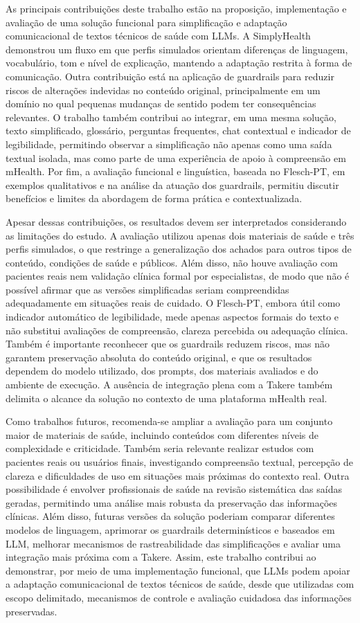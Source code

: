 As principais contribuições deste trabalho estão na proposição, implementação e avaliação de uma solução funcional para simplificação e adaptação comunicacional de textos técnicos de saúde com LLMs. A SimplyHealth demonstrou um fluxo em que perfis simulados orientam diferenças de linguagem, vocabulário, tom e nível de explicação, mantendo a adaptação restrita à forma de comunicação. Outra contribuição está na aplicação de guardrails para reduzir riscos de alterações indevidas no conteúdo original, principalmente em um domínio no qual pequenas mudanças de sentido podem ter consequências relevantes. O trabalho também contribui ao integrar, em uma mesma solução, texto simplificado, glossário, perguntas frequentes, chat contextual e indicador de legibilidade, permitindo observar a simplificação não apenas como uma saída textual isolada, mas como parte de uma experiência de apoio à compreensão em mHealth. Por fim, a avaliação funcional e linguística, baseada no Flesch-PT, em exemplos qualitativos e na análise da atuação dos guardrails, permitiu discutir benefícios e limites da abordagem de forma prática e contextualizada.

Apesar dessas contribuições, os resultados devem ser interpretados considerando as limitações do estudo. A avaliação utilizou apenas dois materiais de saúde e três perfis simulados, o que restringe a generalização dos achados para outros tipos de conteúdo, condições de saúde e públicos. Além disso, não houve avaliação com pacientes reais nem validação clínica formal por especialistas, de modo que não é possível afirmar que as versões simplificadas seriam compreendidas adequadamente em situações reais de cuidado. O Flesch-PT, embora útil como indicador automático de legibilidade, mede apenas aspectos formais do texto e não substitui avaliações de compreensão, clareza percebida ou adequação clínica. Também é importante reconhecer que os guardrails reduzem riscos, mas não garantem preservação absoluta do conteúdo original, e que os resultados dependem do modelo utilizado, dos prompts, dos materiais avaliados e do ambiente de execução. A ausência de integração plena com a Takere também delimita o alcance da solução no contexto de uma plataforma mHealth real.

Como trabalhos futuros, recomenda-se ampliar a avaliação para um conjunto maior de materiais de saúde, incluindo conteúdos com diferentes níveis de complexidade e criticidade. Também seria relevante realizar estudos com pacientes reais ou usuários finais, investigando compreensão textual, percepção de clareza e dificuldades de uso em situações mais próximas do contexto real. Outra possibilidade é envolver profissionais de saúde na revisão sistemática das saídas geradas, permitindo uma análise mais robusta da preservação das informações clínicas. Além disso, futuras versões da solução poderiam comparar diferentes modelos de linguagem, aprimorar os guardrails determinísticos e baseados em LLM, melhorar mecanismos de rastreabilidade das simplificações e avaliar uma integração mais próxima com a Takere. Assim, este trabalho contribui ao demonstrar, por meio de uma implementação funcional, que LLMs podem apoiar a adaptação comunicacional de textos técnicos de saúde, desde que utilizadas com escopo delimitado, mecanismos de controle e avaliação cuidadosa das informações preservadas.

